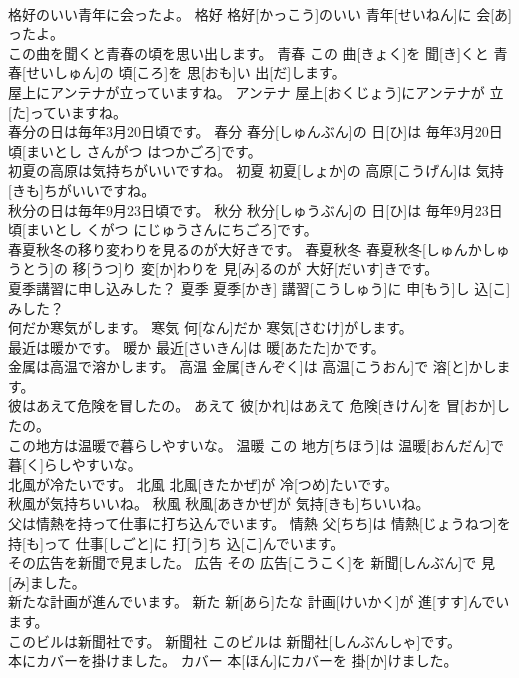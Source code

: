 \documentclass[8pt]{extreport}
\begin{document}
\begin{CJK}{UTF8}{min}
\\	格好のいい青年に会ったよ。	格好	格好[かっこう]のいい 青年[せいねん]に 会[あ]ったよ。	
\\	この曲を聞くと青春の頃を思い出します。	青春	この 曲[きょく]を 聞[き]くと 青春[せいしゅん]の 頃[ころ]を 思[おも]い 出[だ]します。	
\\	屋上にアンテナが立っていますね。	アンテナ	屋上[おくじょう]にアンテナが 立[た]っていますね。	
\\	春分の日は毎年3月20日頃です。	春分	春分[しゅんぶん]の 日[ひ]は 毎年3月20日頃[まいとし さんがつ はつかごろ]です。	
\\	初夏の高原は気持ちがいいですね。	初夏	初夏[しょか]の 高原[こうげん]は 気持[きも]ちがいいですね。	
\\	秋分の日は毎年9月23日頃です。	秋分	秋分[しゅうぶん]の 日[ひ]は 毎年9月23日頃[まいとし くがつ にじゅうさんにちごろ]です。	
\\	春夏秋冬の移り変わりを見るのが大好きです。	春夏秋冬	春夏秋冬[しゅんかしゅうとう]の 移[うつ]り 変[か]わりを 見[み]るのが 大好[だいす]きです。	
\\	夏季講習に申し込みした？	夏季	夏季[かき] 講習[こうしゅう]に 申[もう]し 込[こ]みした？	
\\	何だか寒気がします。	寒気	何[なん]だか 寒気[さむけ]がします。	
\\	最近は暖かです。	暖か	最近[さいきん]は 暖[あたた]かです。	
\\	金属は高温で溶かします。	高温	金属[きんぞく]は 高温[こうおん]で 溶[と]かします。	
\\	彼はあえて危険を冒したの。	あえて	彼[かれ]はあえて 危険[きけん]を 冒[おか]したの。	
\\	この地方は温暖で暮らしやすいな。	温暖	この 地方[ちほう]は 温暖[おんだん]で 暮[く]らしやすいな。	
\\	北風が冷たいです。	北風	北風[きたかぜ]が 冷[つめ]たいです。	
\\	秋風が気持ちいいね。	秋風	秋風[あきかぜ]が 気持[きも]ちいいね。	
\\	父は情熱を持って仕事に打ち込んでいます。	情熱	父[ちち]は 情熱[じょうねつ]を 持[も]って 仕事[しごと]に 打[う]ち 込[こ]んでいます。	
\\	その広告を新聞で見ました。	広告	その 広告[こうこく]を 新聞[しんぶん]で 見[み]ました。	
\\	新たな計画が進んでいます。	新た	新[あら]たな 計画[けいかく]が 進[すす]んでいます。	
\\	このビルは新聞社です。	新聞社	このビルは 新聞社[しんぶんしゃ]です。	
\\	本にカバーを掛けました。	カバー	本[ほん]にカバーを 掛[か]けました。	

\end{CJK}
\end{document}
